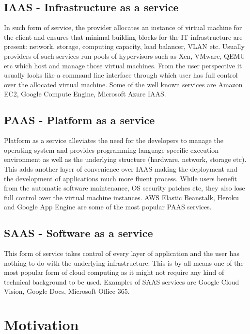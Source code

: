 \documentclass[licencjacka,en]{thesisclass}
\begin{document}
\subsection{IAAS - Infrastructure as a service}

In such form of service, the provider allocates an instance of virtual machine for the client 
and ensures that minimal building blocks for the IT infrastructure are present:
network, storage, computing capacity, load balancer, VLAN etc.
Usually providers of such services run pools of hypervisors such as Xen, VMware, QEMU etc which host and manage
those virtual machines. From the user perspective it usually looks like a command line interface
through which user has full control over the allocated virtual machine. Some of the well known
services are Amazon EC2, Google Compute Engine, Microsoft Azure IAAS.

\subsection{PAAS - Platform as a service}

Platform as a service alleviates the need for the developers to manage the operating system and
provides programming language specific execution environment as well as the underlying structure
(hardware, network, storage etc). This adds another layer of convenience over IAAS making the deployment
and the development of applications much more fluent process. While users benefit from the automatic software maintenance,
OS security patches etc, they also lose full control over the virtual machine instances. AWS Elastic Beanstalk, Heroku
and Google App Engine are some of the most popular PAAS services.

\subsection{SAAS - Software as a service}

This form of service takes control of every layer of application and the user has nothing to do with
the underlying infrastructure. This is by all means one of the most popular form of cloud computing as
it might not require any kind of technical background to be used. Examples of SAAS services are Google
Cloud Vision, Google Docs, Microsoft Office 365. 

\section{Motivation}
\end{document}
